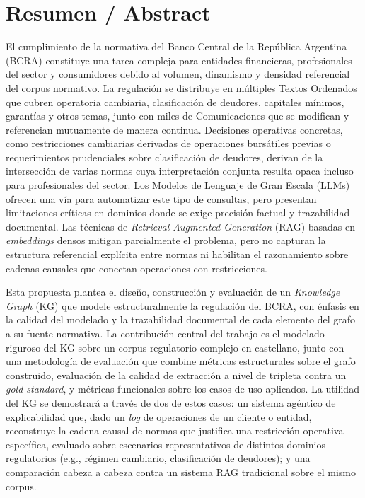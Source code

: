 \documentclass[12pt,a4paper]{article}
\begin{document}
\section*{Resumen / Abstract}
El cumplimiento de la normativa del Banco Central de la República Argentina (BCRA) constituye una tarea compleja para entidades financieras, profesionales del sector y consumidores debido al volumen, dinamismo y densidad referencial del corpus normativo. La regulación se distribuye en múltiples Textos Ordenados que cubren operatoria cambiaria, clasificación de deudores, capitales mínimos, garantías y otros temas, junto con miles de Comunicaciones que se modifican y referencian mutuamente de manera continua. Decisiones operativas concretas, como restricciones cambiarias derivadas de operaciones bursátiles previas o requerimientos prudenciales sobre clasificación de deudores, derivan de la intersección de varias normas cuya interpretación conjunta resulta opaca incluso para profesionales del sector. Los Modelos de Lenguaje de Gran Escala (LLMs) ofrecen una vía para automatizar este tipo de consultas, pero presentan limitaciones críticas en dominios donde se exige precisión factual y trazabilidad documental. Las técnicas de \textit{Retrieval-Augmented Generation} (RAG) basadas en \textit{embeddings} densos mitigan parcialmente el problema, pero no capturan la estructura referencial explícita entre normas ni habilitan el razonamiento sobre cadenas causales que conectan operaciones con restricciones.
 
Esta propuesta plantea el diseño, construcción y evaluación de un \textit{Knowledge Graph} (KG) que modele estructuralmente la regulación del BCRA, con énfasis en la calidad del modelado y la trazabilidad documental de cada elemento del grafo a su fuente normativa. La contribución central del trabajo es el modelado riguroso del KG sobre un corpus regulatorio complejo en castellano, junto con una metodología de evaluación que combine métricas estructurales sobre el grafo construido, evaluación de la calidad de extracción a nivel de tripleta contra un \textit{gold standard}, y métricas funcionales sobre los casos de uso aplicados. La utilidad del KG se demostrará a través de dos de estos casos: un sistema agéntico de explicabilidad que, dado un \textit{log} de operaciones de un cliente o entidad, reconstruye la cadena causal de normas que justifica una restricción operativa específica, evaluado sobre escenarios representativos de distintos dominios regulatorios (e.g., régimen cambiario, clasificación de deudores); y una comparación cabeza a cabeza contra un sistema RAG tradicional sobre el mismo corpus.
\end{document}
